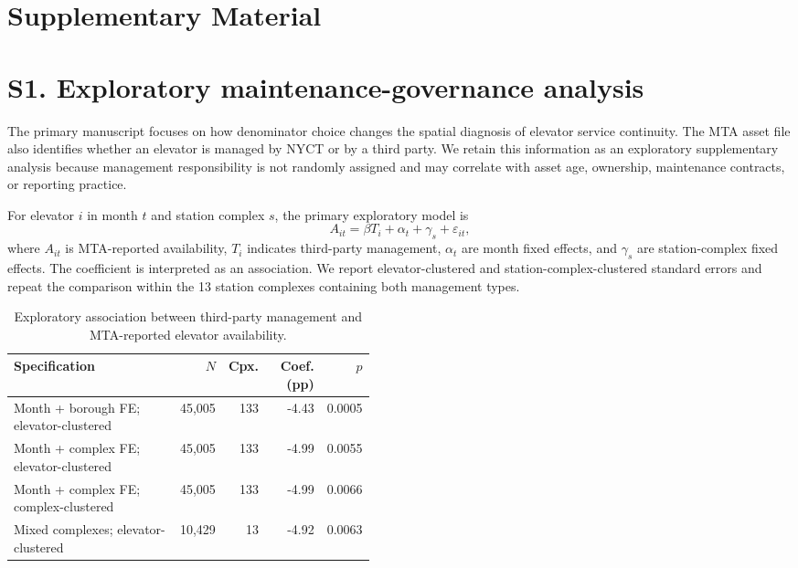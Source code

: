 \documentclass[preprint,12pt]{elsarticle}
\begin{document}
\section*{Supplementary Material}

\section*{S1. Exploratory maintenance-governance analysis}

The primary manuscript focuses on how denominator choice changes the spatial diagnosis of elevator service continuity. The MTA asset file also identifies whether an elevator is managed by NYCT or by a third party. We retain this information as an exploratory supplementary analysis because management responsibility is not randomly assigned and may correlate with asset age, ownership, maintenance contracts, or reporting practice.

For elevator $i$ in month $t$ and station complex $s$, the primary exploratory model is
\begin{equation}
A_{it} = \beta T_i + \alpha_t + \gamma_s + \varepsilon_{it},
\end{equation}
where $A_{it}$ is MTA-reported availability, $T_i$ indicates third-party management, $\alpha_t$ are month fixed effects, and $\gamma_s$ are station-complex fixed effects. The coefficient is interpreted as an association. We report elevator-clustered and station-complex-clustered standard errors and repeat the comparison within the 13 station complexes containing both management types.

\begin{table}[htbp]
\centering
\caption{Exploratory association between third-party management and MTA-reported elevator availability.}
\label{tab:s1}
\footnotesize
\begin{tabular}{@{}p{0.46\linewidth}rrrr@{}}
\toprule
Specification & $N$ & Cpx. & Coef. (pp) & $p$ \\
\midrule
Month + borough FE; elevator-clustered & 45,005 & 133 & -4.43 & 0.0005 \\
Month + complex FE; elevator-clustered & 45,005 & 133 & -4.99 & 0.0055 \\
Month + complex FE; complex-clustered & 45,005 & 133 & -4.99 & 0.0066 \\
Mixed complexes; elevator-clustered & 10,429 & 13 & -4.92 & 0.0063 \\
\bottomrule
\end{tabular}
\end{table}
\end{document}
